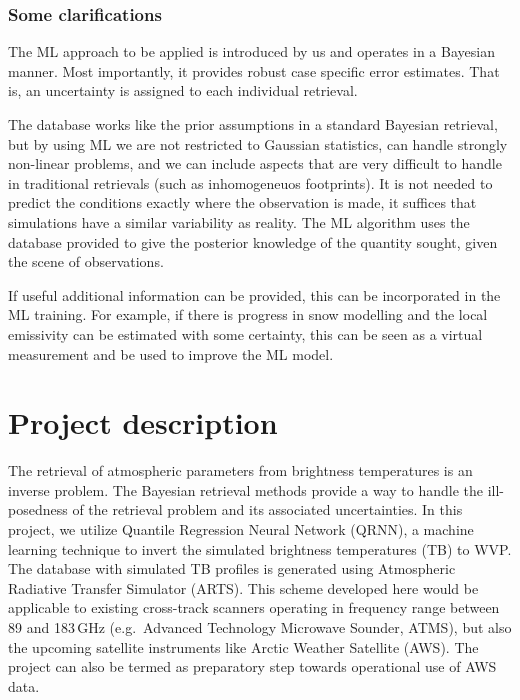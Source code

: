 \documentclass[12pt,oneside,a4paper]{article}
\begin{document}
\subsubsection{Some clarifications}

The ML approach to be applied is introduced by us and operates in a Bayesian
manner. Most importantly, it provides robust case specific error estimates.
That is, an uncertainty is assigned to each individual retrieval.

The database works like the prior assumptions in a standard Bayesian retrieval,
but by using ML we are not restricted to Gaussian statistics, can handle
strongly non-linear problems, and we can include aspects that are very
difficult to handle in traditional retrievals (such as inhomogeneuos
footprints). It is not needed to predict the conditions exactly where the
observation is made, it suffices that simulations have a similar variability as
reality. The ML algorithm uses the database provided to give the posterior
knowledge of the quantity sought, given the scene of observations.

If useful additional information can be provided, this can be incorporated in
the ML training. For example, if there is progress in snow modelling and the
local emissivity can be estimated with some certainty, this can be seen as a
virtual measurement and be used to improve the ML model.



\section{Project description}

The retrieval of atmospheric parameters from brightness temperatures is an inverse problem. The Bayesian retrieval methods provide a way to handle the ill-posedness of the retrieval problem and its associated uncertainties. In this project, we utilize  Quantile Regression Neural Network (QRNN), a machine learning technique to invert the simulated brightness temperatures (TB) to WVP. The database with simulated TB profiles is generated using Atmospheric Radiative Transfer Simulator (ARTS). This scheme developed here would be applicable to existing cross-track scanners operating in frequency range between 89 and 183\,GHz (e.g.\, Advanced Technology Microwave Sounder, ATMS), but also the upcoming satellite instruments like Arctic Weather Satellite (AWS). The project can also be termed as preparatory step towards operational use of AWS data.
 
\end{document}
